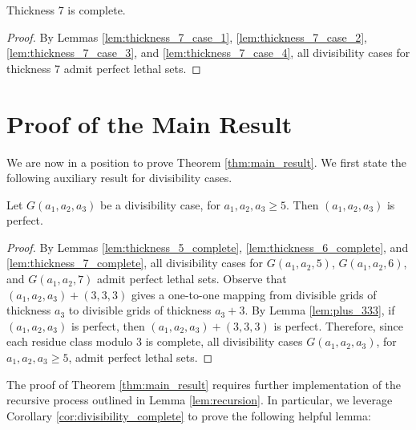\begin{lem}
Thickness 7 is complete.
\end{lem}

\begin{proof}
\label{lem:thickness_7_complete}
By Lemmas \ref{lem:thickness_7_case_1}, \ref{lem:thickness_7_case_2}, \ref{lem:thickness_7_case_3}, and \ref{lem:thickness_7_case_4}, all divisibility cases for thickness 7 admit perfect lethal sets.
\end{proof}

\section{Proof of the Main Result}

We are now in a position to prove Theorem \ref{thm:main_result}. We first state the following auxiliary result for divisibility cases. 

\begin{cor}
\label{cor:divisibility_complete}
Let $G(a_1,a_2,a_3)$ be a divisibility case, for $a_1, a_2, a_3 \geq 5$. Then $(a_1,a_2,a_3)$ is perfect.
\end{cor}

\begin{proof}
By Lemmas \ref{lem:thickness_5_complete}, \ref{lem:thickness_6_complete}, and \ref{lem:thickness_7_complete}, all divisibility cases for $G(a_1,a_2,5)$, $G(a_1,a_2,6)$, and $G(a_1,a_2,7)$ admit perfect lethal sets. Observe that $(a_1,a_2,a_3) + (3,3,3)$ gives a one-to-one mapping from divisible grids of thickness $a_3$ to divisible grids of thickness $a_3+3$. By Lemma \ref{lem:plus_333}, if $(a_1,a_2,a_3)$ is perfect, then $(a_1,a_2,a_3) + (3,3,3)$ is perfect. Therefore, since each residue class modulo 3 is complete, all divisibility cases $G(a_1,a_2,a_3)$, for $a_1, a_2, a_3 \geq 5$, admit perfect lethal sets.
\end{proof}

The proof of Theorem \ref{thm:main_result} requires further implementation of the recursive process outlined in Lemma \ref{lem:recursion}. In particular, we leverage Corollary \ref{cor:divisibility_complete} to prove the following helpful lemma:


